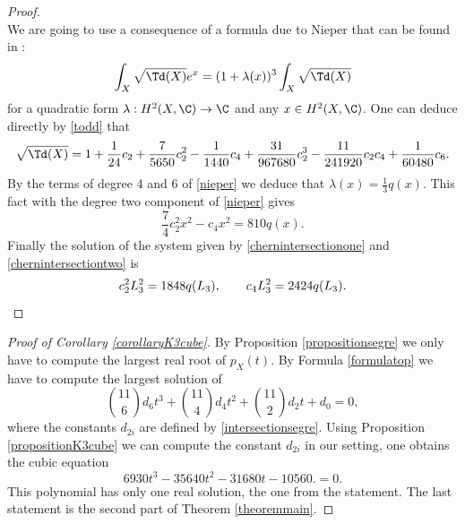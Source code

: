 \begin{proof}
\begin{equation}
\end{equation}
We are going to use a consequence of a formula due to Nieper that can be found in \cite[Th.\,4.2]{Huy03b}:\vspace*{-3pt}
\begin{equation}\label{nieper}
\int_X\sqrt{\Td(X)}e^x=(1+\lambda(x))^3\int_X\sqrt{\Td(X)}
\end{equation}
for a quadratic form $\lambda:H^2(X,\C)\to\C$ and any $x\in H^2(X,\C)$.
One can deduce directly by \eqref{todd} that\vspace*{-3pt}
\[\sqrt{\Td(X)}=1+\frac{1}{24}c_2+\frac{7}{5650}c_2^2-\frac{1}{1440}c_4+\frac{31}{967680}c_2^3-\frac{11}{241920}c_2c_4+\frac{1}{60480}c_6.\]
By the terms of degree 4 and 6 of \eqref{nieper} we deduce that $\lambda(x)=\frac{1}{3}q(x)$. This fact with the degree two component of \eqref{nieper} gives
\begin{equation}\label{chernintersectiontwo}
\frac{7}{4}c_2^2x^2-c_4x^2=810 q(x).
\end{equation}
Finally the solution of the system given by \eqref{chernintersectionone} and \eqref{chernintersectiontwo} is
\[
c_2^2 L_3^2=1848 q(L_3), \qquad
c_4 L_3^2=2424 q(L_3).\qedhere
\]
\end{proof}

\begin{proof}[Proof of Corollary \ref{corollaryK3cube}]
By Proposition \ref{propositionsegre} we only have to compute the
largest real root of $p_X(t)$.
By Formula \eqref{formulatop}
we have to compute the largest solution of
\[
\binom{11}{6} d_6 t^3 + \binom{11}{4} d_4 t^2 + \binom{11}{2} d_2 t + d_0 = 0,
\]
where the constants $d_{2i}$ are defined by \eqref{intersectionsegre}.
Using Proposition \ref{propositionK3cube} we can compute the constant $d_{2i}$ in our setting,
one obtains the cubic equation
\[
6930 t^3-35640 t^2-31680 t-10560. = 0.
\]
This polynomial has only one real solution, the one from the statement.
The last statement is the second part of Theorem \ref{theoremmain}.
\end{proof}

